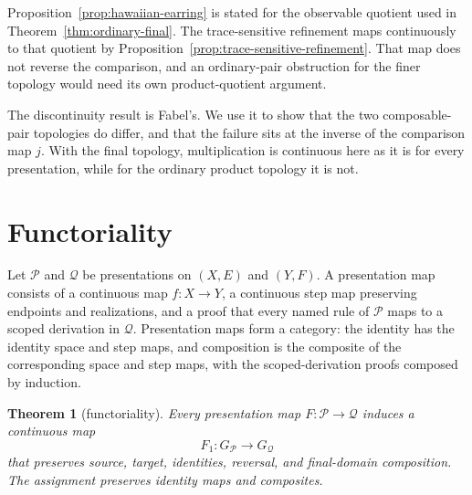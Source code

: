 \documentclass[10pt,reqno]{amsart}
\theoremstyle{definition}
\theoremstyle{plain}
\newtheorem{theorem}[definition]{Theorem}
\theoremstyle{remark}
\begin{document}
Proposition~\ref{prop:hawaiian-earring} is stated for the observable quotient
used in Theorem~\ref{thm:ordinary-final}.  The trace-sensitive refinement maps
continuously to that quotient by
Proposition~\ref{prop:trace-sensitive-refinement}.  That map does not reverse
the comparison, and an ordinary-pair obstruction for the finer topology would
need its own product-quotient argument.

The discontinuity result is Fabel's.  We use it to show that the two
composable-pair topologies do differ, and that the failure sits at the inverse
of the comparison map $j$.  With the final topology, multiplication is
continuous here as it is for every presentation, while for the ordinary
product topology it is not.

\section{Functoriality}
\label{sec:functoriality}

Let $\mathcal P$ and $\mathcal Q$ be presentations on $(X,E)$ and $(Y,F)$.
A presentation map consists of a continuous map $f:X\to Y$, a continuous
step map preserving endpoints and realizations, and a proof that every named
rule of $\mathcal P$ maps to a scoped derivation in $\mathcal Q$.
Presentation maps form a category: the identity has the identity space and step
maps, and composition is the composite of the corresponding space and step
maps, with the scoped-derivation proofs composed by induction.

\begin{theorem}[functoriality]
Every presentation map $F:\mathcal P\to\mathcal Q$ induces a continuous map
\[
  F_1:G_{\mathcal P}\longrightarrow G_{\mathcal Q}
\]
that preserves source, target, identities, reversal, and final-domain
composition.  The assignment preserves identity maps and composites.
\end{theorem}
\end{document}
